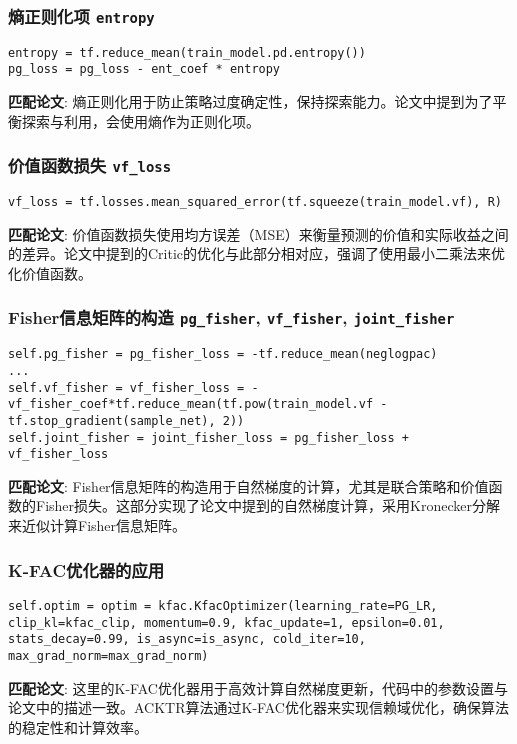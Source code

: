 \documentclass[twocolumn, 10pt]{article} %
\theoremstyle{remark}
\begin{document}
\subsubsection{熵正则化项 \texttt{entropy}}
\begin{lstlisting}[backgroundcolor=\color{lightgray}]
entropy = tf.reduce_mean(train_model.pd.entropy())
pg_loss = pg_loss - ent_coef * entropy
\end{lstlisting}
\noindent \textbf{匹配论文}: 熵正则化用于防止策略过度确定性，保持探索能力。论文中提到为了平衡探索与利用，会使用熵作为正则化项。

\subsubsection{价值函数损失 \texttt{vf\_loss}}
\begin{lstlisting}[backgroundcolor=\color{lightgray}]
vf_loss = tf.losses.mean_squared_error(tf.squeeze(train_model.vf), R)
\end{lstlisting}
\noindent \textbf{匹配论文}: 价值函数损失使用均方误差（MSE）来衡量预测的价值和实际收益之间的差异。论文中提到的Critic的优化与此部分相对应，强调了使用最小二乘法来优化价值函数。

\subsubsection{Fisher信息矩阵的构造 \texttt{pg\_fisher}, \texttt{vf\_fisher}, \texttt{joint\_fisher}}
\begin{lstlisting}[backgroundcolor=\color{lightgray}]
self.pg_fisher = pg_fisher_loss = -tf.reduce_mean(neglogpac)
...
self.vf_fisher = vf_fisher_loss = - vf_fisher_coef*tf.reduce_mean(tf.pow(train_model.vf - tf.stop_gradient(sample_net), 2))
self.joint_fisher = joint_fisher_loss = pg_fisher_loss + vf_fisher_loss
\end{lstlisting}
\noindent \textbf{匹配论文}: Fisher信息矩阵的构造用于自然梯度的计算，尤其是联合策略和价值函数的Fisher损失。这部分实现了论文中提到的自然梯度计算，采用Kronecker分解来近似计算Fisher信息矩阵。

\subsubsection{K-FAC优化器的应用}
\begin{lstlisting}[backgroundcolor=\color{lightgray}]
self.optim = optim = kfac.KfacOptimizer(learning_rate=PG_LR, clip_kl=kfac_clip, momentum=0.9, kfac_update=1, epsilon=0.01, stats_decay=0.99, is_async=is_async, cold_iter=10, max_grad_norm=max_grad_norm)
\end{lstlisting}
\noindent \textbf{匹配论文}: 这里的K-FAC优化器用于高效计算自然梯度更新，代码中的参数设置与论文中的描述一致。ACKTR算法通过K-FAC优化器来实现信赖域优化，确保算法的稳定性和计算效率。
\end{document}
